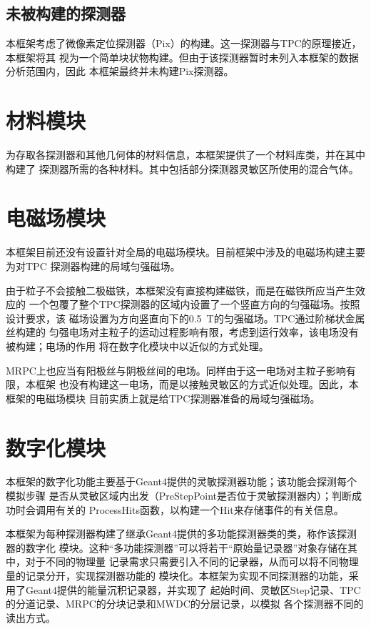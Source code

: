 \documentclass[bachelor,openany,oneside,color]{buaathesis}
\begin{document}
\subsection{未被构建的探测器}

本框架考虑了微像素定位探测器（Pix）的构建。这一探测器与TPC的原理接近，本框架将其
视为一个简单块状物构建。但由于该探测器暂时未列入本框架的数据分析范围内，因此
本框架最终并未构建Pix探测器。

\section{材料模块}

为存取各探测器和其他几何体的材料信息，本框架提供了一个材料库类，并在其中构建了
探测器所需的各种材料。其中包括部分探测器灵敏区所使用的混合气体。

\section{电磁场模块}

本框架目前还没有设置针对全局的电磁场模块。目前框架中涉及的电磁场构建主要为对TPC
探测器构建的局域匀强磁场。

由于粒子不会接触二极磁铁，本框架没有直接构建磁铁，而是在磁铁所应当产生效应的
一个包覆了整个TPC探测器的区域内设置了一个竖直方向的匀强磁场。按照设计要求，该
磁场设置为方向竖直向下的\SI{0.5}{\tesla}的匀强磁场。TPC通过阶梯状金属丝构建的
匀强电场对主粒子的运动过程影响有限，考虑到运行效率，该电场没有被构建；电场的作用
将在数字化模块中以近似的方式处理。

MRPC上也应当有阳极丝与阴极丝间的电场。同样由于这一电场对主粒子影响有限，本框架
也没有构建这一电场，而是以接触灵敏区的方式近似处理。因此，本框架的电磁场模块
目前实质上就是给TPC探测器准备的局域匀强磁场。

\section{数字化模块}

本框架的数字化功能主要基于Geant4提供的灵敏探测器功能；该功能会探测每个模拟步骤
是否从灵敏区域内出发（PreStepPoint是否位于灵敏探测器内）；判断成功时会调用有关的
ProcessHits函数，以构建一个Hit来存储事件的有关信息。

本框架为每种探测器构建了继承Geant4提供的多功能探测器类的类，称作该探测器的数字化
模块。这种“多功能探测器”可以将若干“原始量记录器”对象存储在其中，对于不同的物理量
记录需求只需要引入不同的记录器，从而可以将不同物理量的记录分开，实现探测器功能的
模块化。本框架为实现不同探测器的功能，采用了Geant4提供的能量沉积记录器，并实现了
起始时间、灵敏区Step记录、TPC的分道记录、MRPC的分块记录和MWDC的分层记录，以模拟
各个探测器不同的读出方式。
\end{document}
